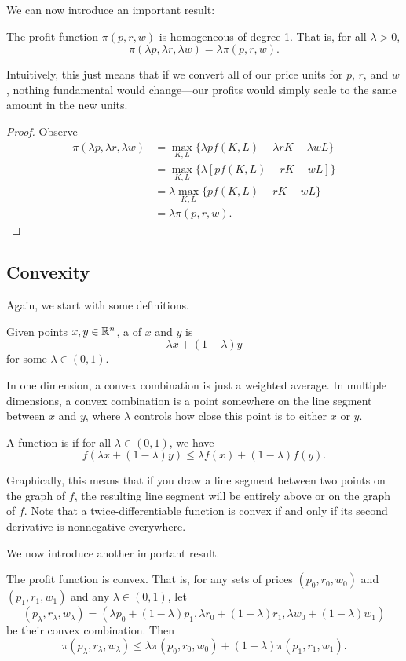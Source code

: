 We can now introduce an important result:
\begin{proposition}
The profit function $\pi(p, r, w)$ is homogeneous of degree 1. That is, for all $\lambda > 0$, 
$$\pi(\lambda p, \lambda r, \lambda w) = \lambda \pi(p, r, w).$$
\end{proposition}
Intuitively, this just means that if we convert all of our price units for $p$, $r$, and $w$, nothing fundamental would change---our profits would simply scale to the same amount in the new units.
\begin{proof}
Observe
$$
\begin{aligned}
\pi(\lambda p, \lambda r, \lambda w)&= \max _{K, L}\{\lambda p f(K, L)-\lambda r K-\lambda w L\} \\
&= \max _{K, L}\{\lambda[p f(K, L)-r K-w L]\} \\
&=\lambda \max _{K, L}\{p f(K, L)-r K-w L\}\\
&=\lambda \pi(p, r, w).
\end{aligned}
$$
\end{proof}

\subsection*{Convexity}
Again, we start with some definitions.
\begin{definition}
Given points $x, y \in \mathbb{R}^n$, a  of $x$ and $y$ is 
$$\lambda x + (1-\lambda)y$$
for some $\lambda \in (0, 1)$. 
\end{definition}
In one dimension, a convex combination is just a weighted average. In multiple dimensions, a convex combination is a point somewhere on the line segment between $x$ and $y$, where $\lambda$ controls how close this point is to either $x$ or $y$.

\begin{definition}
A function is  if for all $\lambda \in (0, 1)$, we have
$$f(\lambda x+(1-\lambda) y) \leq \lambda f(x)+(1-\lambda) f(y).$$
\end{definition}
Graphically, this means that if you draw a line segment between two points on the graph of $f$, the resulting line segment will be entirely above or on the graph of $f$. Note that a twice-differentiable function is convex if and only if its second derivative is nonnegative everywhere.

We now introduce another important result.

\begin{proposition}
The profit function is convex. That is, for any sets of prices $(p_0, r_0, w_0)$ and $(p_1, r_1, w_1)$ and any $\lambda \in (0, 1)$, let
$$\left(p_{\lambda}, r_{\lambda}, w_{\lambda}\right)=\left(\lambda p_{0}+(1-\lambda) p_{1}, \lambda r_{0}+(1-\lambda) r_{1}, \lambda w_{0}+(1-\lambda) w_{1}\right)$$
be their convex combination. Then 
$$\pi\left(p_{\lambda}, r_{\lambda}, w_{\lambda}\right) \leq \lambda \pi\left(p_{0}, r_{0}, w_{0}\right)+(1-\lambda) \pi\left(p_{1}, r_{1}, w_{1}\right).$$
\end{proposition}

